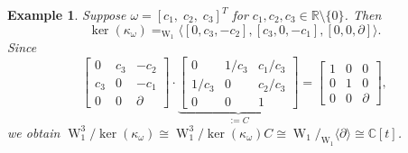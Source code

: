 \documentclass[a4paper,10pt]{article}
\newtheorem{Corollary}[Th]{Corollary}
\newtheorem{ex}[Th]{Example}
\theoremstyle{nonumberplain}
\newtheorem{proof}{Proof}
\newcommand{\R}{\mathbb{R}}
\newcommand{\C}{\mathbb{C}}
\DeclareMathOperator{\W}{W}
\begin{document}




\begin{ex}
Suppose $\omega=[ c_1, \; c_2, \; c_3 ]^T$ for $c_1, c_2, c_3 \in \R\setminus\{0\}$. Then 
$$ 
\ker(\kappa_\omega)=_{\W_1}\langle[0,c_3,-c_2], [c_3,0,-c_1], [0,0,\partial]\rangle.
$$
Since
$$
\left[ \begin{array}{ccc} 
     0 & c_3 & -c_2 \\ c_3 & 0 & -c_1 \\ 0 & 0 & \partial
       \end{array}
\right]
\cdot
\underbrace{\left[ \begin{array}{ccc} 
0 & 1/c_3 & c_1/c_3 \\ 1/c_3 & 0 & c_2/c_3 \\ 0 & 0 & 1
       \end{array}
\right]}_{:=C}
=
\left[ \begin{array}{ccc} 
     1 & 0 & 0 \\ 0 & 1 & 0 \\ 0 & 0 & \partial
       \end{array}
\right], 
$$
we obtain
$
\W_1^3/\ker(\kappa_{\omega}) \cong \W_1^3/ \ker(\kappa_\omega) C \cong \W_1/ _{\W_1}\langle \partial \rangle \cong \C[t]
$.
\end{ex}
\end{document}
